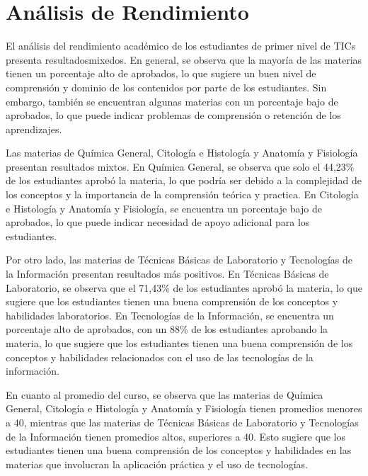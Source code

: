 \vspace{1cm}
\section{Análisis de Rendimiento}
El análisis del rendimiento académico de los estudiantes de primer nivel de TICs presenta resultadosmixedos. En general, se observa que la mayoría de las materias tienen un porcentaje alto de aprobados, lo que sugiere un buen nivel de comprensión y dominio de los contenidos por parte de los estudiantes. Sin embargo, también se encuentran algunas materias con un porcentaje bajo de aprobados, lo que puede indicar problemas de comprensión o retención de los aprendizajes.

Las materias de Química General, Citología e Histología y Anatomía y Fisiología presentan resultados mixtos. En Química General, se observa que solo el 44,23\% de los estudiantes aprobó la materia, lo que podría ser debido a la complejidad de los conceptos y la importancia de la comprensión teórica y practica. En Citología e Histología y Anatomía y Fisiología, se encuentra un porcentaje bajo de aprobados, lo que puede indicar necesidad de apoyo adicional para los estudiantes.

Por otro lado, las materias de Técnicas Básicas de Laboratorio y Tecnologías de la Información presentan resultados más positivos. En Técnicas Básicas de Laboratorio, se observa que el 71,43\% de los estudiantes aprobó la materia, lo que sugiere que los estudiantes tienen una buena comprensión de los conceptos y habilidades laboratorios. En Tecnologías de la Información, se encuentra un porcentaje alto de aprobados, con un 88\% de los estudiantes aprobando la materia, lo que sugiere que los estudiantes tienen una buena comprensión de los conceptos y habilidades relacionados con el uso de las tecnologías de la información.

En cuanto al promedio del curso, se observa que las materias de Química General, Citología e Histología y Anatomía y Fisiología tienen promedios menores a 40, mientras que las materias de Técnicas Básicas de Laboratorio y Tecnologías de la Información tienen promedios altos, superiores a 40. Esto sugiere que los estudiantes tienen una buena comprensión de los conceptos y habilidades en las materias que involucran la aplicación práctica y el uso de tecnologías.

